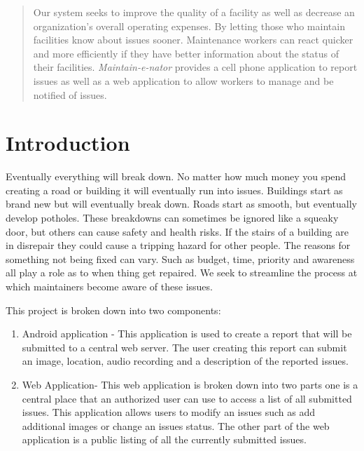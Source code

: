 \documentclass{acm_proc_article-sp}
\begin{document}
\begin{abstract}
Our system seeks to improve the quality of a facility as well as decrease an organization's overall operating expenses.  By letting those who maintain facilities know about issues sooner. Maintenance workers can react quicker and more efficiently if they have better information about the status of their facilities.  \textit{Maintain-e-nator} provides a cell phone application to report issues as well as a web application to allow workers to manage and be notified of issues.
\end{abstract}



\section{Introduction}
Eventually everything will break down. No matter how much money you spend creating a road or building it will eventually run into issues. Buildings start as brand new but will eventually break down.  Roads start as smooth, but eventually develop potholes.  These breakdowns can sometimes be ignored like a squeaky door, but others can cause safety and health risks. If the stairs of a building are in disrepair they could cause a tripping hazard for other people. The reasons for something not being fixed can vary. Such as budget, time, priority and awareness all play a role as to when thing get repaired. We seek to streamline the process at which maintainers become aware of these issues.

This project is broken down into two components:
\vspace{-4mm}
\begin{enumerate}[itemsep=0mm]
\item Android application - This application is used to create a report that will be submitted to a central web server. The user creating this report can submit an image, location, audio recording and a description of the reported issues.
\item Web Application- This web application is broken down into two parts one is a central place that an authorized user can use to access a list of all submitted issues. This application allows users to modify an issues such as add additional images or change an issues status. The other part of the web application is a public listing of all the currently submitted issues.
\end{enumerate}
\end{document}
